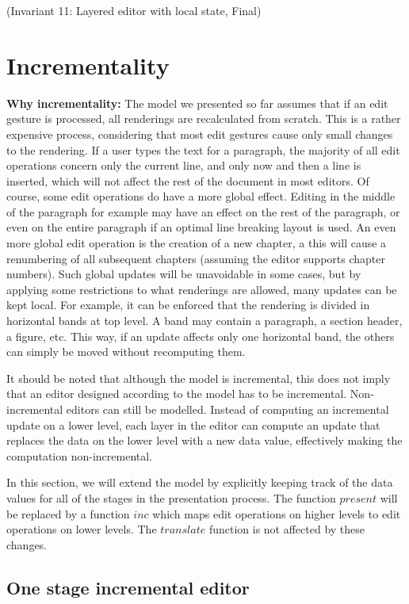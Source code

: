 {\centering (Invariant 11: Layered editor with local state, Final)\\}\vspace{1em}
\section{Incrementality}




{\bf Why incrementality: }The model we presented so far assumes that if an edit gesture is processed, all renderings are recalculated from scratch. This is a rather expensive process, considering that most edit gestures cause only small changes to the rendering. If a user types the text for a paragraph, the majority of all edit operations concern only the current line, and only now and then a line is inserted, which will not affect the rest of the document in most editors. Of course, some edit operations do have a more global effect. Editing in the middle of the paragraph for example may have an effect on the rest of the paragraph, or even on the entire paragraph if an optimal line breaking layout is used. An even more global edit operation is the creation of a new chapter, a this will cause a renumbering of all subsequent chapters (assuming the editor supports chapter numbers). Such global updates will be unavoidable in some cases, but by applying some restrictions to what renderings are allowed, many updates can be kept local. For example, it can be enforced that the rendering is divided in horizontal bands at top level. A band may contain a paragraph, a section header, a figure, etc. This way, if an update affects only one horizontal band, the others can simply be moved without recomputing them.

It should be noted that although the model is incremental, this does not imply that an editor designed according to the model has to be incremental. Non-incremental editors can still be modelled. Instead of computing an incremental update on a lower level, each layer in the editor can compute an update that replaces the data on the lower level with a new data value, effectively making the computation non-incremental. 

In this section, we will extend the model by explicitly keeping track of the data values for all of the stages in the presentation process. The function $present$ will be replaced by a function $inc$ which maps edit operations on higher levels to edit operations on lower levels. The $translate$ function is not affected by these changes.
\subsection{One stage incremental editor	}


